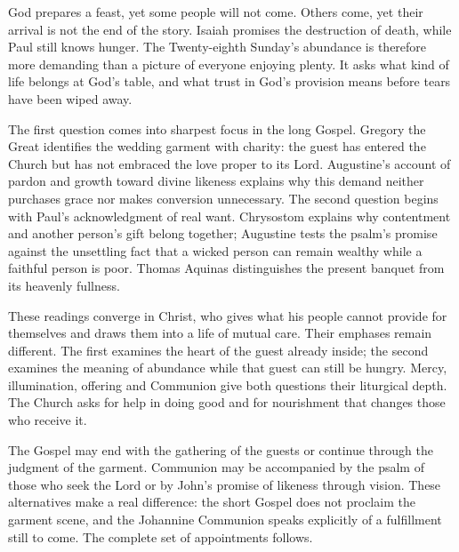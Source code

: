 God prepares a feast, yet some people will not come. Others come, yet their arrival is not the end of the story. Isaiah promises the destruction of death, while Paul still knows hunger. The Twenty-eighth Sunday's abundance is therefore more demanding than a picture of everyone enjoying plenty. It asks what kind of life belongs at God's table, and what trust in God's provision means before tears have been wiped away.

The first question comes into sharpest focus in the long Gospel. Gregory the Great identifies the wedding garment with charity: the guest has entered the Church but has not embraced the love proper to its Lord. Augustine's account of pardon and growth toward divine likeness explains why this demand neither purchases grace nor makes conversion unnecessary. The second question begins with Paul's acknowledgment of real want. Chrysostom explains why contentment and another person's gift belong together; Augustine tests the psalm's promise against the unsettling fact that a wicked person can remain wealthy while a faithful person is poor. Thomas Aquinas distinguishes the present banquet from its heavenly fullness.

These readings converge in Christ, who gives what his people cannot provide for themselves and draws them into a life of mutual care. Their emphases remain different. The first examines the heart of the guest already inside; the second examines the meaning of abundance while that guest can still be hungry. Mercy, illumination, offering and Communion give both questions their liturgical depth. The Church asks for help in doing good and for nourishment that changes those who receive it.

The Gospel may end with the gathering of the guests or continue through the judgment of the garment. Communion may be accompanied by the psalm of those who seek the Lord or by John's promise of likeness through vision. These alternatives make a real difference: the short Gospel does not proclaim the garment scene, and the Johannine Communion speaks explicitly of a fulfillment still to come. The complete set of appointments follows.
